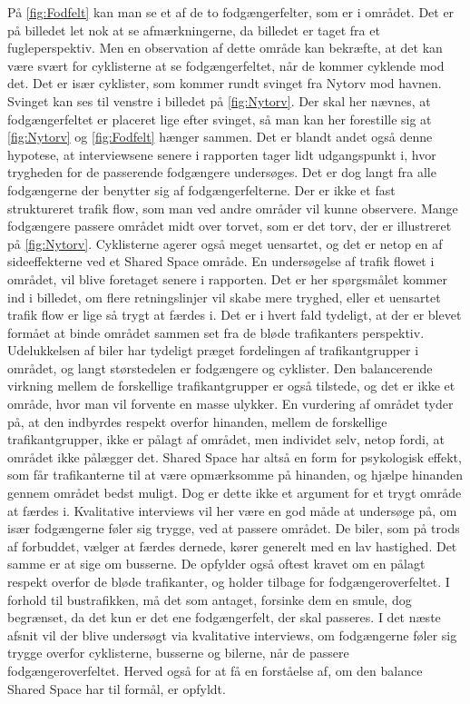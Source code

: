 På \cref{fig:Fodfelt} kan man se et af de to fodgængerfelter, som er i området. Det er på billedet let nok at se afmærkningerne, da billedet er taget fra et fugleperspektiv. Men en observation af dette område kan bekræfte, at det kan være svært for cyklisterne at se fodgængerfeltet, når de kommer cyklende mod det. Det er især cyklister, som kommer rundt svinget fra Nytorv mod havnen. Svinget kan ses til venstre i billedet på \cref{fig:Nytorv}. Der skal her nævnes, at fodgængerfeltet er placeret lige efter svinget, så man kan her forestille sig at \cref{fig:Nytorv} og \cref{fig:Fodfelt} hænger sammen. Det er blandt andet også denne hypotese, at interviewsene senere i rapporten tager lidt udgangspunkt i, hvor trygheden for de passerende fodgængere undersøges.
Det er dog langt fra alle fodgængerne der benytter sig af fodgængerfelterne. Der er ikke et fast struktureret trafik flow, som man ved andre områder vil kunne observere. Mange fodgængere passere området midt over torvet, som er det torv, der er illustreret på \cref{fig:Nytorv}. Cyklisterne agerer også meget uensartet, og det er netop en af sideeffekterne ved et Shared Space område. En undersøgelse af trafik flowet i området, vil blive foretaget senere i rapporten. Det er her spørgsmålet kommer ind i billedet, om flere retningslinjer vil skabe mere tryghed, eller et uensartet trafik flow er lige så trygt at færdes i. Det er i hvert fald tydeligt, at der er blevet formået at binde området sammen set fra de bløde trafikanters perspektiv. Udelukkelsen af biler har tydeligt præget fordelingen af trafikantgrupper i området, og langt størstedelen er fodgængere og cyklister. Den balancerende virkning mellem de forskellige trafikantgrupper er også tilstede, og det er ikke et område, hvor man vil forvente en masse ulykker. En vurdering af området tyder på, at den indbyrdes respekt overfor hinanden, mellem de forskellige trafikantgrupper, ikke er pålagt af området, men individet selv, netop fordi, at området ikke pålægger det. Shared Space har altså en form for psykologisk effekt, som får trafikanterne til at være opmærksomme på hinanden, og hjælpe hinanden gennem området bedst muligt. Dog er dette ikke et argument for et trygt område at færdes i. Kvalitative interviews vil her være en god måde at undersøge på, om især fodgængerne føler sig trygge, ved at passere området.
De biler, som på trods af forbuddet, vælger at færdes dernede, kører generelt med en lav hastighed. Det samme er at sige om busserne. De opfylder også oftest kravet om en pålagt respekt overfor de bløde trafikanter, og holder tilbage for fodgængeroverfeltet. I forhold til bustrafikken, må det som antaget, forsinke dem en smule, dog begrænset, da det kun er det ene fodgængerfelt, der skal passeres.
I det næste afsnit vil der blive undersøgt via kvalitative interviews, om fodgængerne føler sig trygge overfor cyklisterne, busserne og bilerne, når de passere fodgængeroverfeltet. Herved også for at få en forståelse af, om den balance Shared Space har til formål, er opfyldt.
